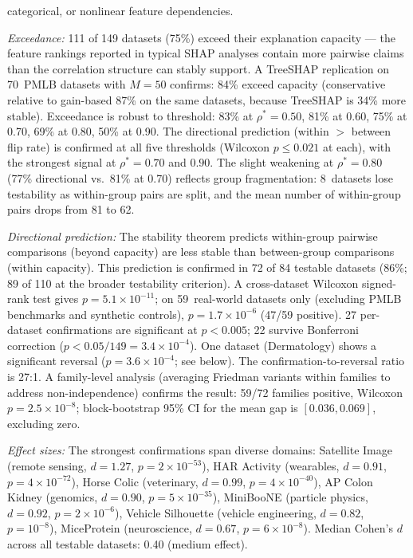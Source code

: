 \documentclass[11pt,a4paper]{article}
\begin{document}
categorical, or nonlinear feature dependencies.

\emph{Exceedance:} 111 of 149 datasets (75\%) exceed their explanation capacity --- the feature rankings reported in typical SHAP analyses contain more pairwise claims than the correlation structure can stably support.  A TreeSHAP replication on 70~PMLB datasets with $M = 50$ confirms: 84\% exceed capacity (conservative relative to gain-based 87\% on the same datasets, because TreeSHAP is 34\% more stable).  Exceedance is robust to threshold: 83\% at $\rho^* = 0.50$, 81\% at 0.60, 75\% at 0.70, 69\% at 0.80, 50\% at 0.90.  The directional prediction (within $>$ between flip rate) is confirmed at all five thresholds (Wilcoxon $p \leq 0.021$ at each), with the strongest signal at $\rho^* = 0.70$ and $0.90$.  The slight weakening at $\rho^* = 0.80$ (77\% directional vs.\ 81\% at 0.70) reflects group fragmentation: 8~datasets lose testability as within-group pairs are split, and the mean number of within-group pairs drops from 81 to 62.

\emph{Directional prediction:} The stability theorem predicts within-group pairwise comparisons (beyond capacity) are less stable than between-group comparisons (within capacity).  This prediction is confirmed in 72 of 84 testable datasets (86\%; 89 of 110 at the broader testability criterion).  A cross-dataset Wilcoxon signed-rank test gives $p = 5.1 \times 10^{-11}$; on 59~real-world datasets only (excluding PMLB benchmarks and synthetic controls), $p = 1.7 \times 10^{-6}$ (47/59 positive).  27 per-dataset confirmations are significant at $p < 0.005$; 22 survive Bonferroni correction ($p < 0.05/149 = 3.4 \times 10^{-4}$).  One dataset (Dermatology) shows a significant reversal ($p = 3.6 \times 10^{-4}$; see below).  The confirmation-to-reversal ratio is 27:1.  A family-level analysis (averaging Friedman variants within families to address non-independence) confirms the result: 59/72 families positive, Wilcoxon $p = 2.5 \times 10^{-8}$; block-bootstrap 95\% CI for the mean gap is $[0.036, 0.069]$, excluding zero.

\emph{Effect sizes:} The strongest confirmations span diverse domains: Satellite Image (remote sensing, $d = 1.27$, $p = 2 \times 10^{-53}$), HAR Activity (wearables, $d = 0.91$, $p = 4 \times 10^{-72}$), Horse Colic (veterinary, $d = 0.99$, $p = 4 \times 10^{-40}$), AP Colon Kidney (genomics, $d = 0.90$, $p = 5 \times 10^{-35}$), MiniBooNE (particle physics, $d = 0.92$, $p = 2 \times 10^{-6}$), Vehicle Silhouette (vehicle engineering, $d = 0.82$, $p = 10^{-8}$), MiceProtein (neuroscience, $d = 0.67$, $p = 6 \times 10^{-8}$).  Median Cohen's $d$ across all testable datasets: 0.40 (medium effect).
\end{document}
